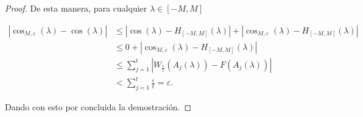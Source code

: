 \begin{proof}
    De esta manera, para cualquier $\lambda \in [-M, M]$

    \begin{equation}
        \begin{split}
            |\cos_{M,\varepsilon}(\lambda) - \cos(\lambda)| 
            &\leq
            |\cos(\lambda) -  H_{[- M, M]}(\lambda)|
            + 
            | \cos_{M,\varepsilon}(\lambda) -  H_{[- M, M]}(\lambda)|  \\
            &\leq  0 
            + | \cos_{M,\varepsilon}(\lambda) -  H_{[- M, M]}(\lambda)| \\
            & \leq  \sum_{j=1}^t 
            |  W_{ \frac{\varepsilon}{t}}(A_j(\lambda)) 
            -
            F( A_j(\lambda))
             | \\
             & <   \sum_{j=1}^t \frac{\varepsilon}{t} = \varepsilon .
        \end{split}
    \end{equation}

    Dando con esto por concluida la demostración. 
\end{proof}

